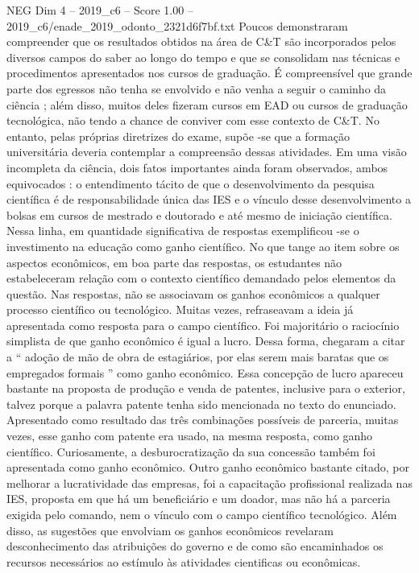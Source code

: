\begin{textsample}{NEG Dim 4 – 2019\_c6 – Score 1.00 – 2019\_c6/enade\_2019\_odonto\_2321d6f7bf.txt}
Poucos demonstraram compreender que os resultados obtidos na área de C\&T são incorporados pelos diversos campos do saber ao longo do tempo e que se consolidam nas técnicas e procedimentos apresentados nos cursos de graduação.
É compreensível que grande parte dos egressos não tenha se envolvido e não venha a seguir o caminho da ciência ; além disso, muitos deles fizeram cursos em EAD ou cursos de graduação tecnológica, não tendo a chance de conviver com esse contexto de C\&T.
No entanto, pelas próprias diretrizes do exame, supõe -se que a formação universitária deveria contemplar a compreensão dessas atividades.
Em uma visão incompleta da ciência, dois fatos importantes ainda foram observados, ambos equivocados : o entendimento tácito de que o desenvolvimento da pesquisa científica é de responsabilidade única das IES e o vínculo desse desenvolvimento a bolsas em cursos de mestrado e doutorado e até mesmo de iniciação científica.
Nessa linha, em quantidade significativa de respostas exemplificou -se o investimento na educação como ganho científico.
No que tange ao item sobre os aspectos econômicos, em boa parte das respostas, os estudantes não estabeleceram relação com o contexto científico demandado pelos elementos da questão.
Nas respostas, não se associavam os ganhos econômicos a qualquer processo científico ou tecnológico.
Muitas vezes, refraseavam a ideia já apresentada como resposta para o campo científico.
Foi majoritário o raciocínio simplista de que ganho econômico é igual a lucro.
Dessa forma, chegaram a citar a “ adoção de mão de obra de estagiários, por elas serem mais baratas que os empregados formais ” como ganho econômico.
Essa concepção de lucro apareceu bastante na proposta de produção e venda de patentes, inclusive para o exterior, talvez porque a palavra patente tenha sido mencionada no texto do enunciado.
Apresentado como resultado das três combinações possíveis de parceria, muitas vezes, esse ganho com patente era usado, na mesma resposta, como ganho científico.
Curiosamente, a desburocratização da sua concessão também foi apresentada como ganho econômico.
Outro ganho econômico bastante citado, por melhorar a lucratividade das empresas, foi a capacitação profissional realizada nas IES, proposta em que há um beneficiário e um doador, mas não há a parceria exigida pelo comando, nem o vínculo com o campo científico tecnológico.
Além disso, as sugestões que envolviam os ganhos econômicos revelaram desconhecimento das atribuições do governo e de como são encaminhados os recursos necessários ao estímulo às atividades cientificas ou econômicas.

\end{textsample}
